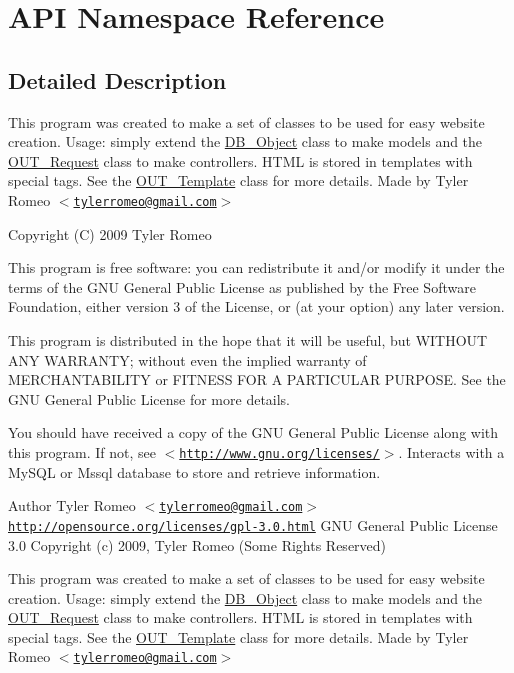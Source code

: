 \hypertarget{namespaceAPI}{
\section{API Namespace Reference}
\label{d1/d0e/namespaceAPI}
}


\subsection{Detailed Description}
This program was created to make a set of classes to be used for easy website creation. Usage: simply extend the \hyperlink{classDB__Object}{DB\_\-Object} class to make models and the \hyperlink{classOUT__Request}{OUT\_\-Request} class to make controllers. HTML is stored in templates with special tags. See the \hyperlink{classOUT__Template}{OUT\_\-Template} class for more details. Made by Tyler Romeo $<$\href{mailto:tylerromeo@gmail.com}{\tt tylerromeo@gmail.com}$>$

Copyright (C) 2009 Tyler Romeo

This program is free software: you can redistribute it and/or modify it under the terms of the GNU General Public License as published by the Free Software Foundation, either version 3 of the License, or (at your option) any later version.

This program is distributed in the hope that it will be useful, but WITHOUT ANY WARRANTY; without even the implied warranty of MERCHANTABILITY or FITNESS FOR A PARTICULAR PURPOSE. See the GNU General Public License for more details.

You should have received a copy of the GNU General Public License along with this program. If not, see $<$\href{http://www.gnu.org/licenses/}{\tt http://www.gnu.org/licenses/}$>$. Interacts with a MySQL or Mssql database to store and retrieve information.

\begin{DoxyAuthor}{Author}
Tyler Romeo $<$\href{mailto:tylerromeo@gmail.com}{\tt tylerromeo@gmail.com}$>$  \href{http://opensource.org/licenses/gpl-3.0.html}{\tt http://opensource.org/licenses/gpl-\/3.0.html} GNU General Public License 3.0  Copyright (c) 2009, Tyler Romeo (Some Rights Reserved)
\end{DoxyAuthor}
This program was created to make a set of classes to be used for easy website creation. Usage: simply extend the \hyperlink{classDB__Object}{DB\_\-Object} class to make models and the \hyperlink{classOUT__Request}{OUT\_\-Request} class to make controllers. HTML is stored in templates with special tags. See the \hyperlink{classOUT__Template}{OUT\_\-Template} class for more details. Made by Tyler Romeo $<$\href{mailto:tylerromeo@gmail.com}{\tt tylerromeo@gmail.com}$>$

